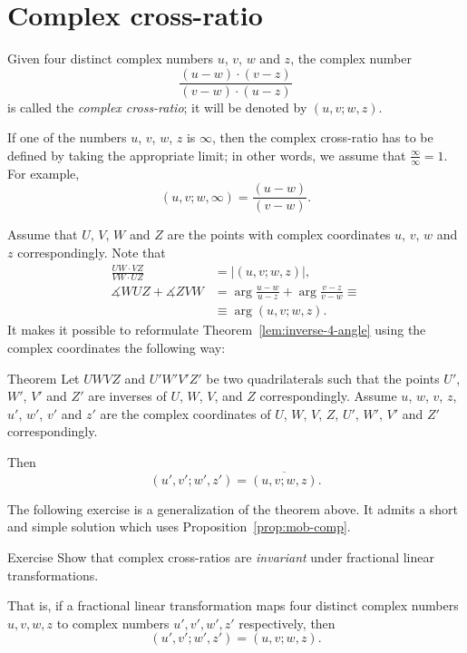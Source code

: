 \section*{Complex cross-ratio}

Given four distinct complex numbers $u$, $v$, $w$ and $z$,
the complex number
$$
\frac{(u-w)\cdot(v-z)}{(v-w)\cdot(u-z)}$$
is called the \emph{complex cross-ratio}; 
it will be denoted by $(u,v;w,z)$.

If one of the numbers $u$, $v$, $w$, $z$ is $\infty$, 
then the complex cross-ratio has to be defined by taking the appropriate limit; in other words, we assume that $\frac\infty\infty=1$.
For example,
$$(u, v; w, \infty)=\frac{(u-w)}{(v-w)}.$$

Assume that $U$, $V$, $W$ and  $Z$ are the points with complex coordinates  
$u$, $v$, $w$ and $z$ correspondingly.
Note that 
\begin{align*}
\frac{UW\cdot VZ}{VW\cdot UZ}&=|(u,v;w,z)|,
\\
\measuredangle WUZ +\measuredangle ZVW&=\arg\frac{u-w}{u-z}+\arg\frac{v-z}{v-w}\equiv 
\\
&\equiv \arg(u,v;w,z).
\end{align*}
It makes it possible to reformulate Theorem~\ref{lem:inverse-4-angle} using the complex coordinates
the following way:

\begin{thm}{Theorem}\label{lem:inverse-4-angle-C}
Let $UWVZ$ and $U'W'V'Z'$  be two quadrilaterals 
such that the points $U'$, $W'$, $V'$ and $Z'$ are inverses of $U$, $W$, $V$, and $Z$ correspondingly.
Assume $u$, $w$, $v$, $z$, $u'$, $w'$, $v'$ and $z'$ are the complex coordinates of $U$, $W$, $V$, $Z$, $U'$, $W'$, $V'$ and $Z'$ correspondingly.

Then 
$$(u',v';w',z')=\overline{(u,v;w,z)}.$$

\end{thm}

The following exercise is a generalization of the theorem above.
It admits a short and simple solution which uses Proposition~\ref{prop:mob-comp}.

\begin{thm}{Exercise}\label{ex:C-cross-ratio}
Show that 
complex cross-ratios are {}\emph{invariant} under fractional linear transformations. 

That is, if a fractional linear transformation maps four distinct complex numbers $u, v, w, z$ to complex numbers $u', v', w', z'$ respectively, then
$$
(u',v';w',z')
=
(u,v;w,z).
$$

\end{thm}

